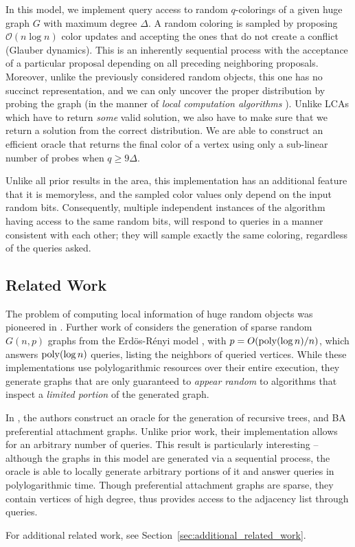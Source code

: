 In this model, we implement query access to random $q$-colorings of a given huge graph $G$ with maximum degree $\Delta$.
A random coloring is sampled by proposing $\mathcal O(n\log n)$ color updates and accepting the ones that do not create a conflict (Glauber dynamics).
This is an inherently sequential process with the acceptance of a particular proposal depending on all preceding neighboring proposals.
Moreover, unlike the previously considered random objects, this one has no succinct representation, and we can only uncover the proper distribution
by probing the graph (in the manner of \emph{local computation algorithms} \cite{LCA, LCA_space_efficient}).
Unlike LCAs which have to return \emph{some} valid solution, we also have to make sure that we return a solution from the correct distribution.
We are able to construct an efficient oracle that returns the final color of a vertex using only a sub-linear number of probes when $q\ge 9\Delta$.

Unlike all prior results in the area, this implementation has an additional feature that it is memoryless,
and the sampled color values only depend on the input random bits.
Consequently, multiple independent instances of the algorithm having access to the same random bits,
will respond to queries in a manner consistent with each other; they will sample exactly the same coloring, regardless of the queries asked.




\subsection{Related Work}
\label{sec:related_work}
The problem of computing local information of huge random objects was pioneered in \cite{huge_old,huge}.
Further work of \cite{sparse} considers the generation of sparse random $G(n,p)$ graphs from the Erd\"{o}s-R\'{e}nyi model \cite{er},
with $p = O(\mathrm{poly}(\log n)/n)$, which answers $\mathrm{poly}(\log n)$  queries, listing the neighbors of queried vertices.
While these implementations use polylogarithmic resources over their entire execution,
they generate graphs that are  only guaranteed to \emph{appear random} to algorithms that inspect a \emph{limited portion} of the generated graph.

In \cite{reut}, the authors construct an oracle for the generation of recursive trees, and BA preferential attachment graphs.
Unlike prior work, their implementation allows for an arbitrary number of queries.
This result is particularly interesting --  although the graphs in this model are generated via a sequential process,
the oracle is able to locally generate arbitrary portions of it and answer queries in polylogarithmic time.
Though preferential attachment graphs are sparse, they contain vertices of high degree,
thus \cite{reut} provides access to the adjacency list through  queries.

For additional related work, see Section~\ref{sec:additional_related_work}.
